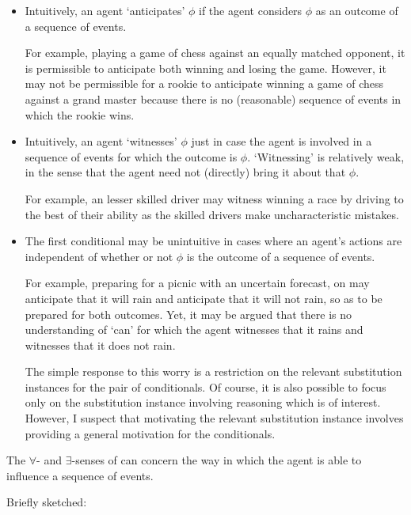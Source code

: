 \documentclass[10pt]{article}
\begin{document}
\begin{itemize}
\item Intuitively, an agent `anticipates' \(\phi\) if the agent considers \(\phi\) as an outcome of a sequence of events.

  For example, playing a game of chess against an equally matched opponent, it is permissible to anticipate both winning and losing the game.
  However, it may not be permissible for a rookie to anticipate winning a game of chess against a grand master because there is no (reasonable) sequence of events in which the rookie wins.

\item Intuitively, an agent `witnesses' \(\phi\) just in case the agent is involved in a sequence of events for which the outcome is \(\phi\). `Witnessing' is relatively weak, in the sense that the agent need not (directly) bring it about that \(\phi\).

  For example, an lesser skilled driver may witness winning a race by driving to the best of their ability as the skilled drivers make uncharacteristic mistakes.
\item The first conditional may be unintuitive in cases where an agent's actions are independent of whether or not \(\phi\) is the outcome of a sequence of events.

  For example, preparing for a picnic with an uncertain forecast, on may anticipate that it will rain and anticipate that it will not rain, so as to be prepared for both outcomes.
  Yet, it may be argued that there is no understanding of `can' for which the agent witnesses that it rains and witnesses that it does not rain.

  The simple response to this worry is a restriction on the relevant substitution instances for the pair of conditionals.
  Of course, it is also possible to focus only on the substitution instance involving reasoning which is of interest.
  However, I suspect that motivating the relevant substitution instance involves providing a general motivation for the conditionals.
\end{itemize}

The \(\forall\)- and \(\exists\)-senses of can concern the way in which the agent is able to influence a sequence of events.

Briefly sketched:
\end{document}
